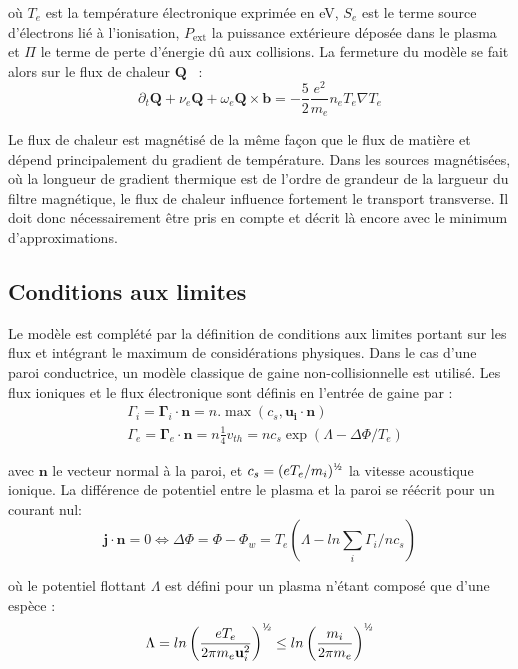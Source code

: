 \begin{refsection}
où $T_e$ est la température électronique exprimée en eV, $S_e$ est le
terme source d'électrons lié à l'ionisation, $P_\text{ext}$ la puissance
extérieure déposée dans le plasma et $\Pi$ le terme de perte d'énergie dû aux collisions. La fermeture du modèle se fait alors sur le flux de chaleur
$\mathbf{Q}$~\cite{Golant} :
\begin{equation}
\partial_t \mathbf{Q} + \nu_e\mathbf{Q}+\omega_e\mathbf{Q}\times\mathbf{b} =
-\frac{5}{2}\frac{e^2}{m_e}n_eT_e\nabla T_e
\end{equation}

Le flux de chaleur est magnétisé de la même façon que le flux de matière et
dépend principalement du gradient de température. Dans les sources magnétisées,
où la longueur de gradient thermique est de l'ordre de grandeur de la largueur
du filtre magnétique, le flux de chaleur influence fortement le transport
transverse. Il doit donc nécessairement être pris en compte et décrit là encore
avec le minimum d'approximations.

\subsection{Conditions aux limites}
Le modèle est complété par la définition de conditions aux limites
portant sur les flux et intégrant le maximum de considérations physiques. Dans
le cas d'une paroi conductrice, un modèle classique de gaine non-collisionnelle
est utilisé. Les flux ioniques et le flux électronique sont définis en
l'entrée de gaine par :
\begin{align}
&\Gamma_i=\boldsymbol{\Gamma}_i\cdot\mathbf{n}=n.\max\left(c_s,\mathbf{u_i}\cdot\mathbf{n}\right)
\\
&\Gamma_e=\boldsymbol{\Gamma}_e\cdot\mathbf{n}=n\frac{1}{4}v_{th}=nc_s\exp(\Lambda-\Delta
\Phi/T_e)
\end{align}

avec $\mathbf{n}$ le vecteur normal à la paroi,
et $c_s=(eT_e/m_i)^{\text{\textonehalf}}$ la vitesse acoustique ionique.
La différence de potentiel entre le plasma et la
paroi se réécrit pour un courant nul:
\begin{equation}
	\mathbf{j}\cdot\mathbf{n}=0\Leftrightarrow \Delta \Phi=\Phi-\Phi_w =
T_e(\Lambda-ln\sum_i\Gamma_i/nc_s)
\end{equation} 

où le potentiel flottant $\Lambda$ est défini pour un plasma
n'étant composé que d'une espèce :
\begin{equation}
	\Lambda=ln\left(\frac{eT_e}{2\pi
	m_e\mathbf{u}_i^2}\right)^{\text{\textonehalf}} \le 
	ln\left(\frac{m_i}{2\pi m_e}\right)^{\text{\textonehalf}}
\end{equation}


\end{refsection}
